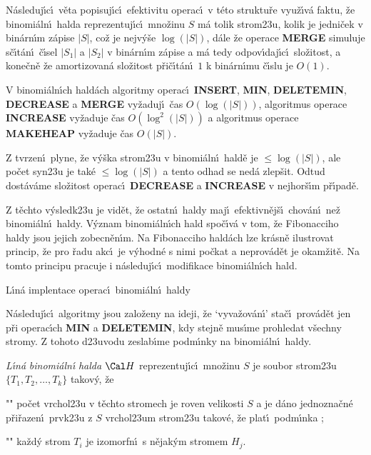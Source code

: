 \flushpar N\'asleduj\'\i c\'\i\ v\v eta popisuj\'\i c\'\i\ efektivitu operac\'\i\ v 
t\'eto struktu\v re vyu\v z\'\i v\'a faktu, \v ze binomi\'aln\'\i\ halda 
reprezentuj\'\i c\'\i\ mno\v zinu $S$ m\'a tolik strom\accent23u, 
kolik je jedni\v cek v bin\'arn\'\i m z\'apise $|S|$, co\v z je nejv\'y\v se 
$\log(|S|)$, d\'ale \v ze operace {\bf MERGE} simuluje s\v c\'\i t\'an\'\i\ 
\v c\'\i sel $|S_1|$ a $|S_2|$ v bin\'arn\'\i m z\'apise 
a m\'a tedy odpov\'\i daj\'\i c\'\i\ slo\v zitost, 
a kone\v cn\v e \v ze amortizovan\'a slo\v zitost p\v ri\v c\'\i t\'an\'\i\ $
1$ k 
bin\'arn\'\i mu \v c\'\i slu je $O(1)$. 
\medskip

V binomi\'aln\'\i ch hald\'ach algoritmy operac\'\i\ 
{\bf IN\-SERT}, {\bf MIN}, {\bf DELETEMIN}, {\bf DECREASE} a {\bf MERGE} vy\-\v za\-duj\'\i\ \v cas 
$O(\log(|S|))$, algoritmus operace {\bf INCRE\-ASE} vy\-\v za\-duje \v cas 
$O(\log^2(|S|))$ a algoritmus ope\-race {\bf MAKEHEAP} vy\v zaduje \v cas 
$O(|S|)$.  
\endproclaim

\flushpar Z tvrzen\'\i\ plyne, \v ze v\'y\v ska strom\accent23u v 
binomi\'aln\'\i\ hald\v e je $\le\log(|S|)$, ale po\v cet syn\accent23u je 
tak\'e $\le\log(|S|)$ a tento odhad se ned\'a zlep\v sit. Odtud 
dost\'av\'ame slo\v zitost operac\'\i\ {\bf DECREASE} a {\bf INCREASE} v nejhor\v s\'\i m p\v r\'\i pad\v e.
\medskip

\flushpar Z t\v echto v\'ysledk\accent23u je vid\v et, \v ze ostatn\'\i\ 
haldy maj\'\i\ efektivn\v ej\v s\'\i\ chov\'an\'\i\ ne\v z binomi\'aln\'\i\ haldy. 
V\'yznam binomi\'aln\'\i ch hald spo\-\v c\'\i\-v\'a v tom, \v ze Fibonacciho 
haldy jsou jejich zobecn\v en\'\i m. Na Fibonacciho hald\'ach lze kr\'asn\v e 
ilustrovat princip, \v ze pro \v radu akc\'\i\ je v\'yhodn\'e s nimi po\v ckat 
a neprov\'ad\v et je okam\v zit\v e. Na tomto principu pracuje i 
n\'asleduj\'\i c\'\i\ modifikace binomi\'aln\'\i ch hald.
\bigskip

\subhead
L\'\i n\'a implentace operac\'\i\ binomi\'aln\'\i\ haldy
\endsubhead
\smallskip

\flushpar N\'asleduj\'\i c\'\i\ algoritmy jsou zalo\v zeny na ideji, \v ze 
`vyva\v zov\'an\'\i ' sta\v c\'\i\ prov\'ad\v et jen p\v ri operac\'\i ch {\bf MIN} a 
{\bf DELETEMIN}, kdy stejn\v e mus\'\i me prohledat v\v sechny 
stromy. Z tohoto d\accent23uvodu zeslab\'\i me podm\'\i nky na 
binomi\'aln\'\i\ haldy.
\medskip

\flushpar\emph{L\'\i n\'a} \emph{binomi\'aln\'\i} \emph{halda} $\Cal H$ 
reprezentuj\'\i c\'\i\ mno\v zinu $S$ je soubor strom\accent23u 
$\{T_1,T_2,\dots,T_k\}$ tako\-v\'y, \v ze  
\roster
\item"{}"
po\v cet vrchol\accent23u v t\v echto stromech je roven 
velikosti $S$ a 
je d\'ano jednozna\v cn\'e p\v ri\v razen\'\i\ prvk\accent23u 
z $S$ vrchol\accent23um strom\accent23u tako\-v\'e, \v ze plat\'\i\ 
podm\'\i nka ;
\item"{}"
ka\v zd\'y strom $T_i$ je izomorfn\'\i\ s n\v ejak\'ym stromem $H_
j$.
\endroster


